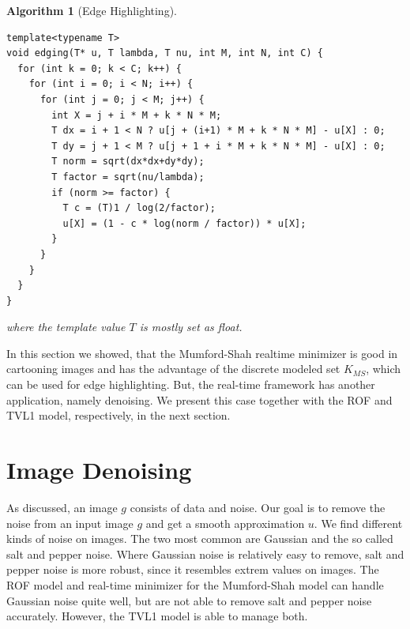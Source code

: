 \documentclass{scrreprt}
\newtheorem{algorithm}[theorem]{Algorithm}
\begin{document}
            \begin{algorithm}[Edge Highlighting]
                \begin{lstlisting}
template<typename T>
void edging(T* u, T lambda, T nu, int M, int N, int C) {
  for (int k = 0; k < C; k++) {
    for (int i = 0; i < N; i++) {
      for (int j = 0; j < M; j++) {
        int X = j + i * M + k * N * M;
        T dx = i + 1 < N ? u[j + (i+1) * M + k * N * M] - u[X] : 0;
        T dy = j + 1 < M ? u[j + 1 + i * M + k * N * M] - u[X] : 0;
        T norm = sqrt(dx*dx+dy*dy);
        T factor = sqrt(nu/lambda);
        if (norm >= factor) {
          T c = (T)1 / log(2/factor);
          u[X] = (1 - c * log(norm / factor)) * u[X];
        }
      }
    }
  }
}
                \end{lstlisting}
                where the template value $T$ is mostly set as float.
            \end{algorithm}


        In this section we showed, that the Mumford-Shah realtime minimizer is good in cartooning images and has the advantage of the discrete modeled set $K_{MS}$, which can be used for edge highlighting. But, the real-time framework has another application, namely denoising. We present this case together with the ROF and TVL1 model, respectively, in the next section.


    \section{Image Denoising} %
    \label{sec:image_denoising}
        
        As discussed, an image $g$ consists of data and noise. Our goal is to remove the noise from an input image $g$ and get a smooth approximation $u$. We find different kinds of noise on images. The two most common are Gaussian and the so called salt and pepper noise. Where Gaussian noise is relatively easy to remove, salt and pepper noise is more robust, since it resembles extrem values on images. The ROF model and real-time minimizer for the Mumford-Shah model can handle Gaussian noise quite well, but are not able to remove salt and pepper noise accurately. However, the TVL1 model is able to manage both.
\end{document}
